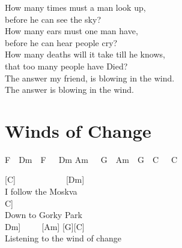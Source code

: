 \documentclass[
  letterpaper,
  twoside=false]{scrbook}
\begin{document}
How many times must a man look up,\\
before he can see the sky?\\
How many ears must one man have,\\
before he can hear people cry?\\
How many deaths will it take \textquotesingle till he knows,\\
that too many people have Died?\\
The answer my friend, is blowing in the wind.\\
The answer is blowing in the wind.

\hypertarget{winds-of-change}{%
\chapter{Winds of Change}\label{winds-of-change}}

F~~Dm~~F~~~Dm Am~~~G~~Am~~G~~C~~~C

{[}C{]}~~~~~~~~~~~~{[}Dm{]}\\
I follow the Moskva\\
\hspace*{0.333em}\hspace*{0.333em}\hspace*{0.333em}\hspace*{0.333em}\hspace*{0.333em}\hspace*{0.333em}\hspace*{0.333em}\hspace*{0.333em}\hspace*{0.333em}\hspace*{0.333em}\hspace*{0.333em}\hspace*{0.333em}\hspace*{0.333em}{[}C{]}\\
Down to Gorky Park\\
\hspace*{0.333em}\hspace*{0.333em}\hspace*{0.333em}\hspace*{0.333em}\hspace*{0.333em}\hspace*{0.333em}\hspace*{0.333em}\hspace*{0.333em}\hspace*{0.333em}\hspace*{0.333em}\hspace*{0.333em}\hspace*{0.333em}\hspace*{0.333em}\hspace*{0.333em}\hspace*{0.333em}\hspace*{0.333em}{[}Dm{]}~~~~~{[}Am{]}
{[}G{]}{[}C{]}\\
Listening to the wind of change
\end{document}
